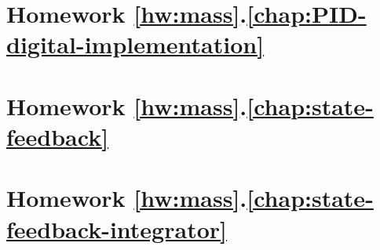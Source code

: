 %		

	\section*{
		Homework \ref{hw:mass}.\ref{chap:PID-digital-implementation}}  \label{hw:mass_digital_PID}
		
	\section*{
		Homework \ref{hw:mass}.\ref{chap:state-feedback}}  \label{hw:mass_state_feedback}
		
	\section*{
		Homework \ref{hw:mass}.\ref{chap:state-feedback-integrator}}  \label{hw:mass_integrator_state_feedback}
		
